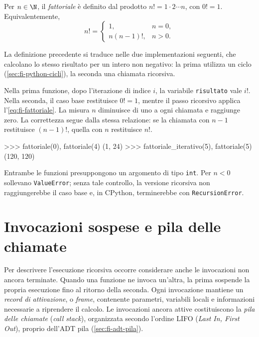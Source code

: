 Per \(n\in\N\), il \emph{fattoriale} è definito dal prodotto
\(n!=1\cdot2\cdots n\), con \(0!=1\). Equivalentemente,
\begin{equation}
  n!=\begin{cases}
    1, & n=0,\\
    n(n-1)!, & n>0.
  \end{cases}
  \label{eq:fi-fattoriale}
\end{equation}

La definizione precedente si traduce nelle due implementazioni
seguenti, che calcolano lo stesso risultato per un intero non negativo:
la prima utilizza un ciclo (\cref{sec:fi-python-cicli}), la seconda
una chiamata ricorsiva.



Nella prima funzione, dopo l'iterazione di indice \(i\), la variabile
\texttt{risultato} vale \(i!\). Nella seconda, il caso base restituisce
\(0!=1\), mentre il passo ricorsivo applica l'\cref{eq:fi-fattoriale}.
La misura \(n\) diminuisce di uno a ogni chiamata e raggiunge zero.
La correttezza segue dalla stessa relazione: se la chiamata con \(n-1\)
restituisce \((n-1)!\), quella con \(n\) restituisce \(n!\).

\begin{unipdterminal}
>>> fattoriale(0), fattoriale(4)
(1, 24)
>>> fattoriale_iterativo(5), fattoriale(5)
(120, 120)
\end{unipdterminal}

Entrambe le funzioni presuppongono un argomento di tipo \texttt{int}.
Per \(n<0\) sollevano \texttt{ValueError}; senza tale controllo,
la versione ricorsiva non raggiungerebbe il caso base e, in CPython,
terminerebbe con \texttt{RecursionError}.

\section{Invocazioni sospese e pila delle chiamate}
\label{sec:fi-pila-ricorsione}

Per descrivere l'esecuzione ricorsiva occorre considerare anche le
invocazioni non ancora terminate. Quando una funzione ne invoca un'altra,
la prima sospende la propria esecuzione fino al ritorno della seconda.
Ogni invocazione mantiene un
\emph{record di attivazione}, o \emph{frame}, contenente parametri,
variabili locali e informazioni necessarie a riprendere il calcolo.
Le invocazioni ancora attive costituiscono la \emph{pila delle chiamate}
(\emph{call stack}), organizzata secondo l'ordine LIFO
(\emph{Last In, First Out}), proprio dell'ADT pila (\cref{sec:fi-adt-pila}).

